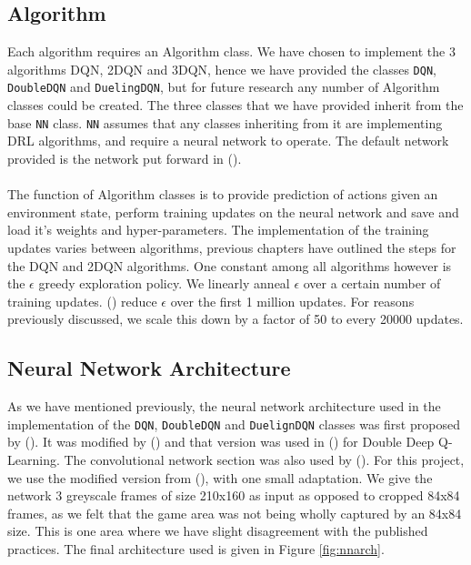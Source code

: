 \subsection{Algorithm}
Each algorithm requires an Algorithm class. We have chosen to implement the 3 algorithms DQN, 2DQN and 3DQN, hence we have provided the classes \texttt{DQN}, \texttt{DoubleDQN} and \texttt{DuelingDQN}, but for future research any number of Algorithm classes could be created. The three classes that we have provided inherit from the base \texttt{NN} class. \texttt{NN} assumes that any classes inheriting from it are implementing DRL algorithms, and require a neural network to operate. The default network provided is the network put forward in (\citet{human}). \paragraph{}

The function of Algorithm classes is to provide prediction of actions given an environment state, perform training updates on the neural network and save and load it's weights and hyper-parameters. The implementation of the training updates varies between algorithms, previous chapters have outlined the steps for the DQN and 2DQN algorithms. One constant among all algorithms however is the $\epsilon$ greedy exploration policy. We linearly anneal $\epsilon$ over a certain number of training updates. (\citet{deepmind1,doubleq,dueling}) reduce $\epsilon$ over the first 1 million updates. For reasons previously discussed, we scale this down by a factor of 50 to every 20000 updates.

\subsection{Neural Network Architecture}
As we have mentioned previously, the neural network architecture used in the implementation of the \texttt{DQN}, \texttt{DoubleDQN} and \texttt{DuelignDQN} classes was first proposed by (\citet{deepmind1}). It was modified by (\citet{human}) and that version was used in (\citet{doubleq}) for Double Deep Q-Learning. The convolutional network section was also used by (\citet{dueling}). For this project, we use the modified version from (\citet{human}), with one small adaptation. We give the network 3 greyscale frames of size 210x160 as input as opposed to cropped 84x84 frames, as we felt that the game area was not being wholly captured by an 84x84 size. This is one area where we have slight disagreement with the published practices. The final architecture used is given in Figure \ref{fig:nnarch}.

